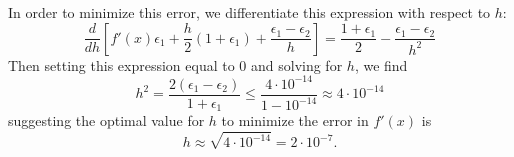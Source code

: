 \documentclass{../../../kin_math}
\begin{document}
\begin{questions}
\begin{solution}
    In order to minimize this error, we differentiate this expression with respect to $h$:
    \begin{equation*}
      \frac{d}{dh}\left[f'(x)\epsilon_1 + \frac{h}{2}(1 + \epsilon_1) + \frac{\epsilon_1 - \epsilon_2}{h}\right] = \frac{1 + \epsilon_1}{2} - \frac{\epsilon_1 - \epsilon_2}{h^2}
    \end{equation*}
    Then setting this expression equal to $0$ and solving for $h$, we find
    \begin{equation*}
      h^2 = \frac{2(\epsilon_1 - \epsilon_2)}{1 + \epsilon_1} \leq \frac{4 \cdot 10^{-14}}{1 - 10^{-14}} \approx 4 \cdot 10^{-14}
    \end{equation*}
    suggesting the optimal value for $h$ to minimize the error in $f'(x)$ is
    \begin{equation*}
      h \approx \sqrt{4 \cdot 10^{-14}} = 2 \cdot 10^{-7}.
    \end{equation*}
  \end{solution}


\end{questions}
\end{document}

